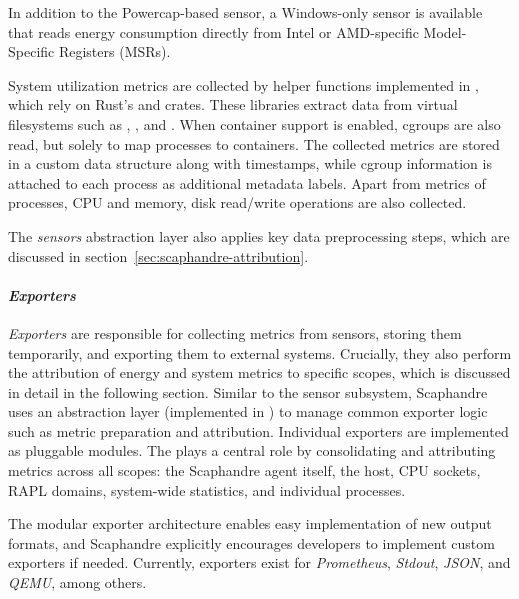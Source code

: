 In addition to the Powercap-based sensor, a Windows-only sensor is available that reads energy consumption directly from Intel or AMD-specific Model-Specific Registers (MSRs).

System utilization metrics are collected by helper functions implemented in , which rely on Rust’s  and  crates. These libraries extract data from virtual filesystems such as , , and . When container support is enabled, cgroups are also read, but solely to map processes to containers. The collected metrics are stored in a custom data structure along with timestamps, while cgroup information is attached to each process as additional metadata labels. Apart from metrics of processes, CPU and memory, disk read/write operations are also collected.

The \textit{sensors} abstraction layer also applies key data preprocessing steps, which are discussed in section~\ref{sec:scaphandre-attribution}.

\paragraph{\textit{Exporters}}

\textit{Exporters} are responsible for collecting metrics from sensors, storing them temporarily, and exporting them to external systems. Crucially, they also perform the attribution of energy and system metrics to specific scopes, which is discussed in detail in the following section. Similar to the sensor subsystem, Scaphandre uses an abstraction layer (implemented in ) to manage common exporter logic such as metric preparation and attribution. Individual exporters are implemented as pluggable modules. The  plays a central role by consolidating and attributing metrics across all scopes: the Scaphandre agent itself, the host, CPU sockets, RAPL domains, system-wide statistics, and individual processes.

The modular exporter architecture enables easy implementation of new output formats, and Scaphandre explicitly encourages developers to implement custom exporters if needed. Currently, exporters exist for \textit{Prometheus}, \textit{Stdout}, \textit{JSON}, and \textit{QEMU}, among others.

